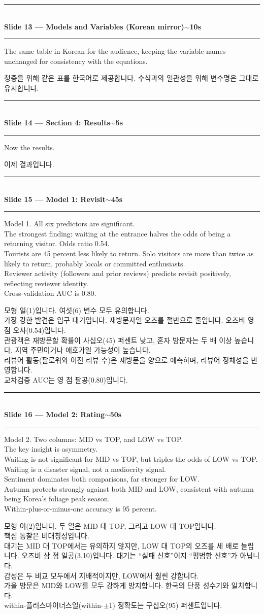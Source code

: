 \documentclass[10pt,a4paper]{article}
\newcommand{\sechead}[2]{%
  \vspace{6pt}%
  \noindent\rule{\linewidth}{0.6pt}\\[1pt]
  {\small\bfseries #1\hfill #2}\\[-3pt]
  \rule{\linewidth}{0.4pt}\par\vspace{2pt}%
}
\newcommand{\sent}[1]{#1\\[4pt]}
\newcommand{\bilingual}[2]{%
  \noindent%
  \begin{minipage}[t]{0.485\linewidth}
    \small #1
  \end{minipage}\hfill\vrule\hfill%
  \begin{minipage}[t]{0.483\linewidth}
    \small #2
  \end{minipage}\par\vspace{3pt}%
}
\begin{document}
\sechead{Slide 13 --- Models and Variables (Korean mirror)}{$\sim$10s}

\bilingual{%
\sent{The same table in Korean for the audience, keeping the variable
names unchanged for consistency with the equations.}
}{%
\sent{청중을 위해 같은 표를 한국어로 제공합니다. 수식과의 일관성을 위해
변수명은 그대로 유지합니다.}
}

\sechead{Slide 14 --- Section 4: Results}{$\sim$5s}

\bilingual{%
\sent{Now the results.}
}{%
\sent{이제 결과입니다.}
}

\sechead{Slide 15 --- Model 1: Revisit}{$\sim$45s}

\bilingual{%
\sent{Model 1. All six predictors are significant.}
\sent{The strongest finding: waiting at the entrance halves the odds of
being a returning visitor. Odds ratio 0.54.}
\sent{Tourists are 45 percent less likely to return. Solo visitors are
more than twice as likely to return, probably locals or committed
enthusiasts.}
\sent{Reviewer activity (followers and prior reviews) predicts revisit
positively, reflecting reviewer identity.}
\sent{Cross-validation AUC is 0.80.}
}{%
\sent{모형 일(1)입니다. 여섯(6) 변수 모두 유의합니다.}
\sent{가장 강한 발견은 입구 대기입니다. 재방문자일 오즈를 절반으로
줄입니다. 오즈비 영 점 오사(0.54)입니다.}
\sent{관광객은 재방문할 확률이 사십오(45) 퍼센트 낮고, 혼자 방문자는 두
배 이상 높습니다. 지역 주민이거나 애호가일 가능성이 높습니다.}
\sent{리뷰어 활동(팔로워와 이전 리뷰 수)은 재방문을 양으로 예측하며,
리뷰어 정체성을 반영합니다.}
\sent{교차검증 AUC는 영 점 팔공(0.80)입니다.}
}

\sechead{Slide 16 --- Model 2: Rating}{$\sim$50s}

\bilingual{%
\sent{Model 2. Two columns: MID vs TOP, and LOW vs TOP.}
\sent{The key insight is asymmetry.}
\sent{Waiting is not significant for MID vs TOP, but triples the odds
of LOW vs TOP. Waiting is a disaster signal, not a mediocrity signal.}
\sent{Sentiment dominates both comparisons, far stronger for LOW.}
\sent{Autumn protects strongly against both MID and LOW, consistent
with autumn being Korea's foliage peak season.}
\sent{Within-plus-or-minus-one accuracy is 95 percent.}
}{%
\sent{모형 이(2)입니다. 두 열은 MID 대 TOP, 그리고 LOW 대 TOP입니다.}
\sent{핵심 통찰은 비대칭성입니다.}
\sent{대기는 MID 대 TOP에서는 유의하지 않지만, LOW 대 TOP의 오즈를
세 배로 늘립니다. 오즈비 삼 점 일공(3.10)입니다. 대기는 ``실패 신호''이지
``평범함 신호''가 아닙니다.}
\sent{감성은 두 비교 모두에서 지배적이지만, LOW에서 훨씬 강합니다.}
\sent{가을 방문은 MID와 LOW를 모두 강하게 방지합니다. 한국의 단풍
성수기와 일치합니다.}
\sent{within-플러스마이너스일(within-$\pm 1$) 정확도는 구십오(95) 퍼센트입니다.}
}
\end{document}
